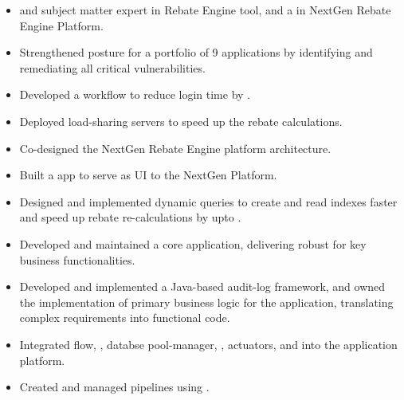 \documentclass[10pt,a4paper,ragged2e, normalphoto]{altacv}
\begin{document}
\begin{itemize}
  \item {} and subject matter expert in Rebate Engine tool, and a  in NextGen Rebate Engine Platform.
  \item Strengthened  posture for a portfolio of 9 applications by identifying and remediating all critical vulnerabilities.
  \item Developed a  workflow to reduce login time by .
  \item Deployed load-sharing servers to speed up the rebate calculations.
  \item Co-designed the NextGen Rebate Engine platform architecture.
  \item Built a  app to serve as UI to the NextGen Platform.
  \item Designed and implemented dynamic  queries to create and read indexes faster and speed up rebate re-calculations by upto .
\end{itemize}
\begin{itemize}
	\item Developed and maintained a core  application, delivering robust  for key business functionalities.
	\item Developed and implemented a Java-based audit-log framework, and owned the implementation of primary business logic for the application, translating complex requirements into functional code.
	\item Integrated  flow, , databse pool-manager, , actuators, and  into the application platform.
	\item Created and managed  pipelines using .
 \end{itemize}
\end{document}
